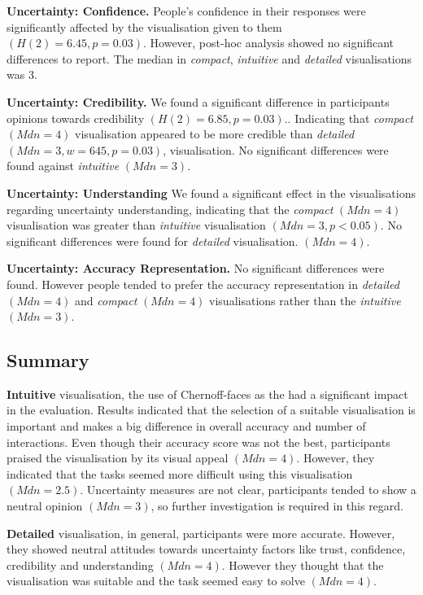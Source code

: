 \documentclass[final,5p,times,twocolumn,authoryear]{elsarticle}
\begin{document}
\textbf{Uncertainty: Confidence.} People's confidence in their responses were significantly affected by the visualisation given to them $(H(2) = 6.45, p = 0.03).$  However, post-hoc analysis showed no significant differences to report. The median in \emph{compact}, \emph{intuitive} and \emph{detailed} visualisations was 3. 

\textbf{Uncertainty: Credibility.} We found a significant difference in participants opinions towards credibility  $(H(2) = 6.85, p = 0.03).$. Indicating that \emph{compact} $(Mdn = 4)$ visualisation appeared to be more credible than \emph{detailed} $(Mdn=3, w=645, p=0.03)$,  visualisation. No significant differences were found against \emph{intuitive} $(Mdn=3)$.

\textbf{Uncertainty: Understanding} We found a significant effect in the visualisations regarding uncertainty understanding, indicating that the \emph{compact} $(Mdn = 4)$ visualisation was greater than \emph{intuitive} visualisation  $(Mdn = 3, p < 0.05)$. No significant differences were found for \emph{detailed} visualisation. $(Mdn = 4)$.

\textbf{Uncertainty: Accuracy Representation.} No significant differences were found. However people tended to prefer the accuracy representation in \emph{detailed} $(Mdn=4)$ and \emph{compact} $(Mdn=4)$ visualisations rather than the \emph{intuitive} $(Mdn=3)$.

\subsection{Summary}

\textbf{Intuitive} visualisation, the use of Chernoff-faces as the  had a significant impact in the evaluation. Results indicated that the selection of a suitable visualisation is important and makes a big difference in overall accuracy and number of interactions. Even though their accuracy score was not the best, participants praised the visualisation by its visual appeal $(Mdn = 4)$. However, they indicated that the tasks seemed more difficult using this visualisation $(Mdn = 2.5)$. Uncertainty measures are not clear, participants tended to show a neutral opinion $(Mdn = 3)$, so further investigation is required in this regard.

\textbf{Detailed} visualisation, in general, participants were more accurate. However, they showed neutral attitudes towards uncertainty factors like trust,  confidence, credibility and understanding $(Mdn = 4)$. However they thought that the visualisation was suitable and the task seemed easy to solve $(Mdn = 4)$.
\end{document}
